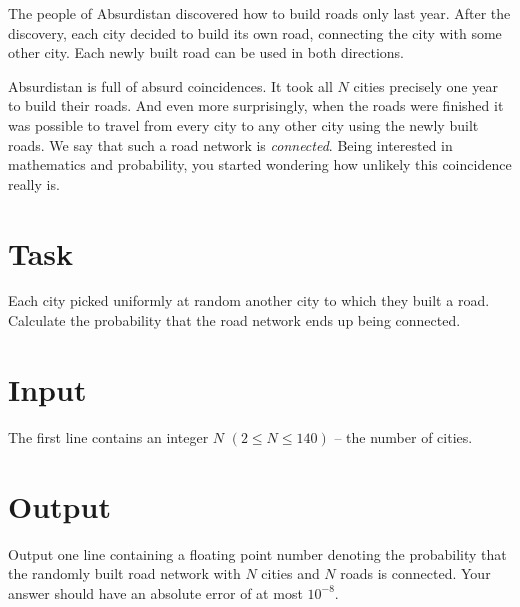 

\noindent
The people of Absurdistan discovered how to build roads only last year. After the discovery, each
city decided to build its own road, connecting the city with some other city. Each newly built road
can be used in both directions.

Absurdistan is full of absurd coincidences. It took all $N$ cities precisely one year to build
their roads. And even more surprisingly, when the roads were finished it was possible to travel from every city to
any other city using the newly built roads. We say that such a road network is \emph{connected}.
Being interested in mathematics
and probability, you started wondering how unlikely this coincidence really is.

\section*{Task}

Each city picked uniformly at random another city to which they built a road.  Calculate the probability that the road network ends up being connected.

\section*{Input}
The first line contains an integer $N$ $(2\le N\le 140)$ -- the number of cities.

\section*{Output}
Output one line containing a floating point number denoting the probability that the randomly built
road network with $N$ cities and $N$ roads is connected. Your answer should have an absolute error of at most $10^{-8}$.
